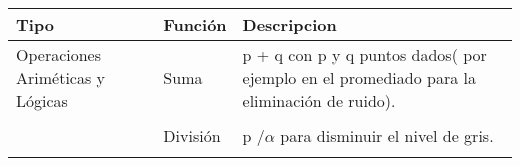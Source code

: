 \documentclass[letterpaper]{article}
\begin{document}
\begin{table}[H]

	\centering
    
	\begin{tabular}[13cm]{ 
    >{\centering\arraybackslash}m{3cm} 
    >{}m{5cm} 
    >{}m{5cm}}
		
        \toprule
        
		\large{Tipo} & \large{Función} & \large{Descripcion} \\
        
		\midrule
        
        Operaciones Ariméticas y Lógicas 
        
        & Suma & p + q con p y q puntos dados( por ejemplo en el promediado para la eliminación de ruido). \\ \\
        
        & División & p /$ \alpha $ para disminuir el nivel de gris.\\ \\
       
        
        \bottomrule
        
	\end{tabular}
    
\end{table}
\end{document}
